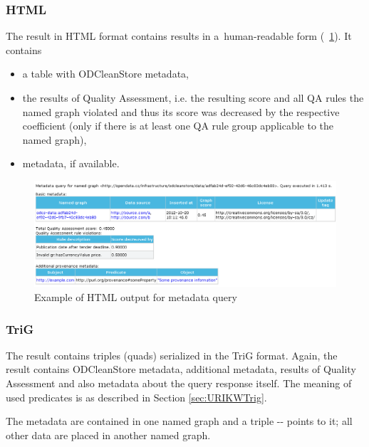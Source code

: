 \subsubsection{HTML}

The result in HTML format contains results in a~human-readable form (\figurename~\ref{fig:metadataQuery}). It contains

\begin{itemize}
  \item a table with ODCleanStore metadata,
  \item the results of Quality Assessment, i.e. the resulting score and all QA rules the named graph violated and thus its score was decreased by the respective coefficient (only if there is at least one QA rule group applicable to the named graph),
  \item {} metadata, if available.
\end{itemize}

\begin{figure}[htb]
    \centering
    \includegraphics[width=\textwidth]{images/metadata-query-screenshot.png}
    \caption{Example of HTML output for metadata query}
	\label{fig:metadataQuery}
\end{figure}

\subsubsection{TriG}
\label{sec:metadataTriG}
The result contains triples (quads) serialized in the TriG format. Again, the result contains ODCleanStore metadata, additional  metadata, results of Quality Assessment and also metadata about the query response itself. The meaning of used predicates is as described in Section \ref{sec:URIKWTrig}.

The  metadata are contained in one named graph and a triple -- points to it; all other data are placed in another named graph.


